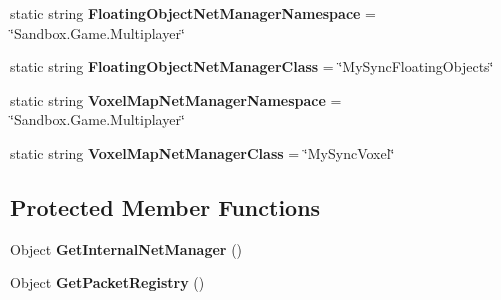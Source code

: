 \begin{DoxyCompactItemize}
\item 
\hypertarget{class_s_e_mod_a_p_i_internal_1_1_a_p_i_1_1_common_1_1_network_manager_a98cf469d7dd143e01ee21e32bb5a3373}{}static string {\bfseries Floating\+Object\+Net\+Manager\+Namespace} = \char`\"{}Sandbox.\+Game.\+Multiplayer\char`\"{}\label{class_s_e_mod_a_p_i_internal_1_1_a_p_i_1_1_common_1_1_network_manager_a98cf469d7dd143e01ee21e32bb5a3373}

\item 
\hypertarget{class_s_e_mod_a_p_i_internal_1_1_a_p_i_1_1_common_1_1_network_manager_aced7f63f13466148fb0595253b7c4d93}{}static string {\bfseries Floating\+Object\+Net\+Manager\+Class} = \char`\"{}My\+Sync\+Floating\+Objects\char`\"{}\label{class_s_e_mod_a_p_i_internal_1_1_a_p_i_1_1_common_1_1_network_manager_aced7f63f13466148fb0595253b7c4d93}

\item 
\hypertarget{class_s_e_mod_a_p_i_internal_1_1_a_p_i_1_1_common_1_1_network_manager_a4c2f5fc972633ba2bcf5008054f8d4cc}{}static string {\bfseries Voxel\+Map\+Net\+Manager\+Namespace} = \char`\"{}Sandbox.\+Game.\+Multiplayer\char`\"{}\label{class_s_e_mod_a_p_i_internal_1_1_a_p_i_1_1_common_1_1_network_manager_a4c2f5fc972633ba2bcf5008054f8d4cc}

\item 
\hypertarget{class_s_e_mod_a_p_i_internal_1_1_a_p_i_1_1_common_1_1_network_manager_a70b49a70e43cdf892b5062402cf1bce8}{}static string {\bfseries Voxel\+Map\+Net\+Manager\+Class} = \char`\"{}My\+Sync\+Voxel\char`\"{}\label{class_s_e_mod_a_p_i_internal_1_1_a_p_i_1_1_common_1_1_network_manager_a70b49a70e43cdf892b5062402cf1bce8}

\end{DoxyCompactItemize}
\subsection*{Protected Member Functions}
\begin{DoxyCompactItemize}
\item 
\hypertarget{class_s_e_mod_a_p_i_internal_1_1_a_p_i_1_1_common_1_1_network_manager_a5c04c843545254b17ddad075ef053644}{}Object {\bfseries Get\+Internal\+Net\+Manager} ()\label{class_s_e_mod_a_p_i_internal_1_1_a_p_i_1_1_common_1_1_network_manager_a5c04c843545254b17ddad075ef053644}

\item 
\hypertarget{class_s_e_mod_a_p_i_internal_1_1_a_p_i_1_1_common_1_1_network_manager_a0ed9f00f3340f3b735a72ec2dccd83df}{}Object {\bfseries Get\+Packet\+Registry} ()\label{class_s_e_mod_a_p_i_internal_1_1_a_p_i_1_1_common_1_1_network_manager_a0ed9f00f3340f3b735a72ec2dccd83df}

\end{DoxyCompactItemize}
